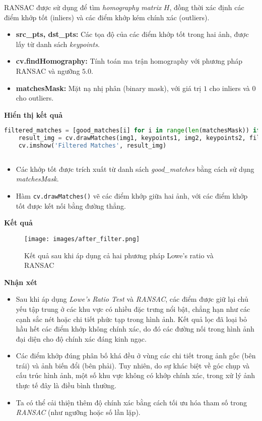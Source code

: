 RANSAC được sử dụng để tìm \textit{homography matrix} \( H \), đồng thời xác định các điểm khớp tốt (inliers) và các điểm khớp kém chính xác (outliers). 

\begin{itemize}
	\item \textbf{src\_pts, dst\_pts:} Các tọa độ của các điểm khớp tốt trong hai ảnh, được lấy từ danh sách \textit{keypoints}.
	\item \textbf{cv.findHomography:} Tính toán ma trận homography với phương pháp RANSAC và ngưỡng \( 5.0 \).
	\item \textbf{matchesMask:} Mặt nạ nhị phân (binary mask), với giá trị \( 1 \) cho inliers và \( 0 \) cho outliers.
\end{itemize}
\textbf{Hiển thị kết quả}
\begin{lstlisting}[language=Python]
	filtered_matches = [good_matches[i] for i in range(len(matchesMask)) if matchesMask[i]]
	result_img = cv.drawMatches(img1, keypoints1, img2, keypoints2, filtered_matches, None, flags=cv.DrawMatchesFlags_NOT_DRAW_SINGLE_POINTS)
    cv.imshow('Filtered Matches', result_img)
	
\end{lstlisting}

\begin{itemize}
	\item Các khớp tốt được trích xuất từ danh sách \textit{good\_matches} bằng cách sử dụng \textit{matchesMask}.
	\item Hàm \texttt{cv.drawMatches()} vẽ các điểm khớp giữa hai ảnh, với các điểm khớp tốt được kết nối bằng đường thẳng.
\end{itemize}

\textbf{Kết quả}

\begin{figure}[H]
	\centering
	\texttt{[image: images/after\_filter.png]}
	\caption{Kết quả sau khi áp dụng cả hai phương pháp Lowe's ratio và RANSAC}
\end{figure}

\textbf{Nhận xét}
\begin{itemize}
	\item Sau khi áp dụng \textit{Lowe's Ratio Test} và \textit{RANSAC}, các điểm được giữ lại chủ yếu tập trung ở các khu vực có nhiều đặc trưng nổi bật, chẳng hạn như các cạnh sắc nét hoặc chi tiết phức tạp trong hình ảnh. Kết quả lọc đã loại bỏ hầu hết các điểm khớp không chính xác, do đó các đường nối trong hình ảnh đại diện cho độ chính xác đáng kinh ngạc.
	\item Các điểm khớp đúng phân bố khá đều ở vùng các chi tiết trong ảnh gốc (bên trái) và ảnh biến đổi (bên phải). Tuy nhiên, do sự khác biệt về góc chụp và cấu trúc hình ảnh, một số khu vực không có khớp chính xác, trong xử lý ảnh thực tế đây là điều bình thường.
	\item Ta có thể cải thiện thêm độ chính xác bằng cách tối ưu hóa tham số trong \textit{RANSAC} (như ngưỡng hoặc số lần lặp).
\end{itemize}


